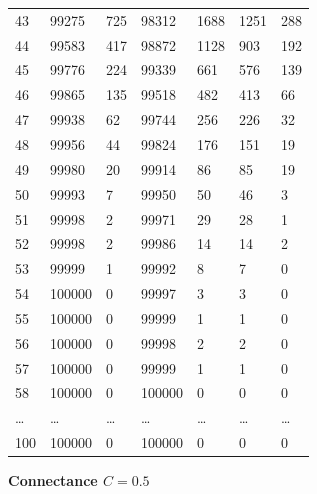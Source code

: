 \documentclass[]{article}
\begin{document}
\begin{longtable}[]{@{}lllllll@{}}
43 & 99275 & 725 & 98312 & 1688 & 1251 & 288\tabularnewline
44 & 99583 & 417 & 98872 & 1128 & 903 & 192\tabularnewline
45 & 99776 & 224 & 99339 & 661 & 576 & 139\tabularnewline
46 & 99865 & 135 & 99518 & 482 & 413 & 66\tabularnewline
47 & 99938 & 62 & 99744 & 256 & 226 & 32\tabularnewline
48 & 99956 & 44 & 99824 & 176 & 151 & 19\tabularnewline
49 & 99980 & 20 & 99914 & 86 & 85 & 19\tabularnewline
50 & 99993 & 7 & 99950 & 50 & 46 & 3\tabularnewline
51 & 99998 & 2 & 99971 & 29 & 28 & 1\tabularnewline
52 & 99998 & 2 & 99986 & 14 & 14 & 2\tabularnewline
53 & 99999 & 1 & 99992 & 8 & 7 & 0\tabularnewline
54 & 100000 & 0 & 99997 & 3 & 3 & 0\tabularnewline
55 & 100000 & 0 & 99999 & 1 & 1 & 0\tabularnewline
56 & 100000 & 0 & 99998 & 2 & 2 & 0\tabularnewline
57 & 100000 & 0 & 99999 & 1 & 1 & 0\tabularnewline
58 & 100000 & 0 & 100000 & 0 & 0 & 0\tabularnewline
\ldots{} & \ldots{} & \ldots{} & \ldots{} & \ldots{} & \ldots{} &
\ldots{}\tabularnewline
100 & 100000 & 0 & 100000 & 0 & 0 & 0\tabularnewline
\bottomrule
\end{longtable}

\textbf{Connectance \(C = 0.5\)}
\end{document}
